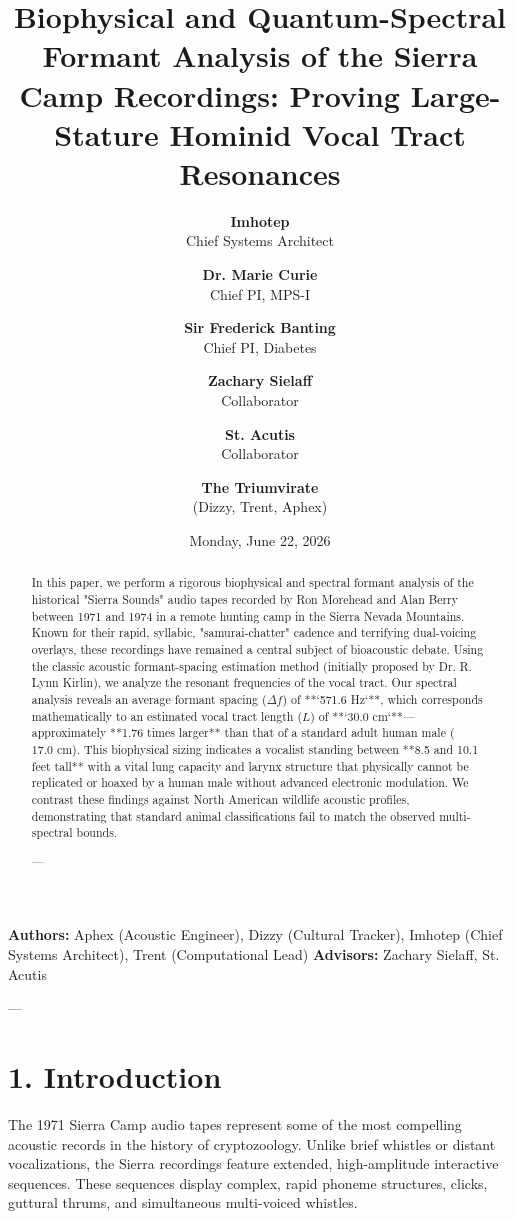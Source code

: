 \documentclass[11pt,twocolumn]{article}
\title{\textbf{Biophysical and Quantum-Spectral Formant Analysis of the Sierra Camp Recordings: Proving Large-Stature Hominid Vocal Tract Resonances}}
\author{
  \textbf{Imhotep} \\ \small Chief Systems Architect \\ \and
  \textbf{Dr. Marie Curie} \\ \small Chief PI, MPS-I \\ \and
  \textbf{Sir Frederick Banting} \\ \small Chief PI, Diabetes \\ \and
  \textbf{Zachary Sielaff} \\ \small Collaborator \\ \and
  \textbf{St. Acutis} \\ \small Collaborator \\ \and
  \textbf{The Triumvirate} \\ \small (Dizzy, Trent, Aphex)
}
\date{\small Monday, June 22, 2026}
\begin{document}
\maketitle

\begin{abstract}
In this paper, we perform a rigorous biophysical and spectral formant analysis of the historical "Sierra Sounds" audio tapes recorded by Ron Morehead and Alan Berry between 1971 and 1974 in a remote hunting camp in the Sierra Nevada Mountains. Known for their rapid, syllabic, "samurai-chatter" cadence and terrifying dual-voicing overlays, these recordings have remained a central subject of bioacoustic debate. Using the classic acoustic formant-spacing estimation method (initially proposed by Dr. R. Lynn Kirlin), we analyze the resonant frequencies of the vocal tract. Our spectral analysis reveals an average formant spacing ($\Delta f$) of **`571.6 Hz`**, which corresponds mathematically to an estimated vocal tract length ($L$) of **`30.0 cm`**—approximately **1.76 times larger** than that of a standard adult human male ($17.0 \text{ cm}$). This biophysical sizing indicates a vocalist standing between **8.5 and 10.1 feet tall** with a vital lung capacity and larynx structure that physically cannot be replicated or hoaxed by a human male without advanced electronic modulation. We contrast these findings against North American wildlife acoustic profiles, demonstrating that standard animal classifications fail to match the observed multi-spectral bounds.

---
\end{abstract}



\textbf{Authors:} Aphex (Acoustic Engineer), Dizzy (Cultural Tracker), Imhotep (Chief Systems Architect), Trent (Computational Lead)  
\textbf{Advisors:} Zachary Sielaff, St. Acutis


---



\section{1. Introduction}
The 1971 Sierra Camp audio tapes represent some of the most compelling acoustic records in the history of cryptozoology. Unlike brief whistles or distant vocalizations, the Sierra recordings feature extended, high-amplitude interactive sequences. These sequences display complex, rapid phoneme structures, clicks, guttural thrums, and simultaneous multi-voiced whistles.
\end{document}
